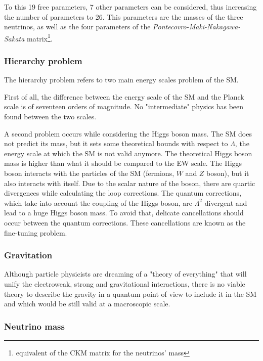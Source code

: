       To this 19 free parameters, 7 other parameters can be considered, thus increasing the number of parameters to 26.
      This parameters are the masses of the three neutrinos, as well as the four parameters of the \textit{Pontecovro-Maki-Nakagawa-Sakata} matrix\footnote{equivalent of the CKM matrix for the neutrinos' mass}.
    
      \subsubsection{Hierarchy problem}

      The hierarchy problem refers to two main energy scales problem of the \gls{SM}.

      First of all, the difference between the energy scale of the \gls{SM} and the Planck scale is of seventeen orders of magnitude.
      No "intermediate" physics has been found between the two scales.

      A second problem occurs while considering the Higgs boson mass.
      The \gls{SM} does not predict its mass, but it sets some theoretical bounds with respect to $\Lambda$, the energy scale at which the \gls{SM} is not valid anymore.
      The theoretical Higgs boson mass is higher than what it should be compared to the EW scale.
      The Higgs boson interacts with the particles of the \gls{SM} (fermions, $W$ and $Z$ boson), but it also interacts with itself.
      Due to the scalar nature of the boson, there are quartic divergences while calculating the loop corrections.
      The quantum corrections, which take into account the coupling of the Higgs boson, are $\Lambda^2$ divergent and lead to a huge Higgs boson mass.
      To avoid that, delicate cancellations should occur between the quantum corrections.
      These cancellations are known as the fine-tuning problem. 
      
      \subsubsection{Gravitation}

      Although particle physicists are dreaming of a "theory of everything" that will unify the electroweak, strong and gravitational interactions, there is no viable theory to describe the gravity in a quantum point of view to include it in the \gls{SM} and which would be still valid at a macroscopic scale.

      \subsubsection{Neutrino mass}

